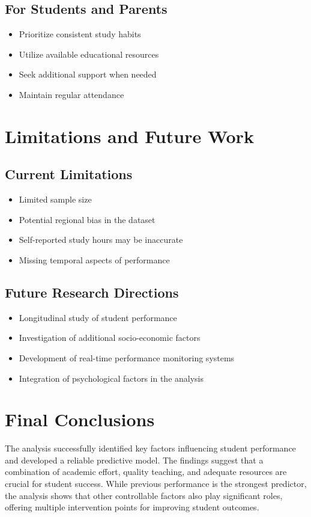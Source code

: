 \subsection{For Students and Parents}
\begin{itemize}
    \item Prioritize consistent study habits
    \item Utilize available educational resources
    \item Seek additional support when needed
    \item Maintain regular attendance
\end{itemize}

\section{Limitations and Future Work}
\subsection{Current Limitations}
\begin{itemize}
    \item Limited sample size
    \item Potential regional bias in the dataset
    \item Self-reported study hours may be inaccurate
    \item Missing temporal aspects of performance
\end{itemize}

\subsection{Future Research Directions}
\begin{itemize}
    \item Longitudinal study of student performance
    \item Investigation of additional socio-economic factors
    \item Development of real-time performance monitoring systems
    \item Integration of psychological factors in the analysis
\end{itemize}

\section{Final Conclusions}
The analysis successfully identified key factors influencing student performance and developed a reliable predictive model. The findings suggest that a combination of academic effort, quality teaching, and adequate resources are crucial for student success. While previous performance is the strongest predictor, the analysis shows that other controllable factors also play significant roles, offering multiple intervention points for improving student outcomes.